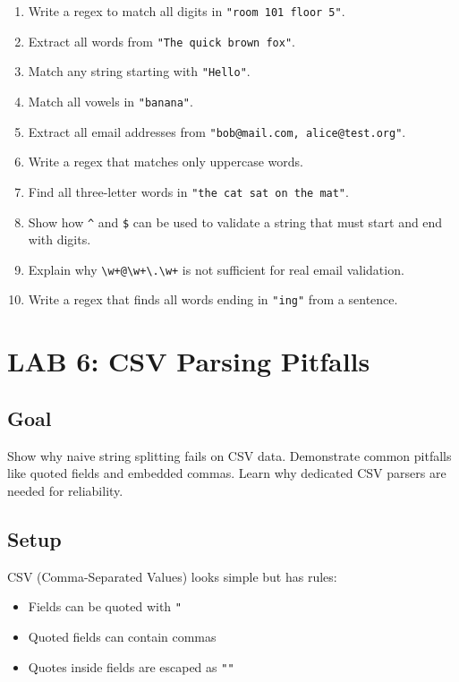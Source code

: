 \documentclass[
  letterpaper,
  DIV=11,
  numbers=noendperiod]{scrreprt}
\providecommand{\tightlist}{%
  \setlength{\itemsep}{0pt}\setlength{\parskip}{0pt}}
\begin{document}
\begin{enumerate}
\def\labelenumi{\arabic{enumi}.}
\tightlist
\item
  Write a regex to match all digits in \texttt{"room\ 101\ floor\ 5"}.
\item
  Extract all words from \texttt{"The\ quick\ brown\ fox"}.
\item
  Match any string starting with \texttt{"Hello"}.
\item
  Match all vowels in \texttt{"banana"}.
\item
  Extract all email addresses from
  \texttt{"bob@mail.com,\ alice@test.org"}.
\item
  Write a regex that matches only uppercase words.
\item
  Find all three-letter words in \texttt{"the\ cat\ sat\ on\ the\ mat"}.
\item
  Show how \texttt{\^{}} and \texttt{\$} can be used to validate a
  string that must start and end with digits.
\item
  Explain why
  \texttt{\textbackslash{}w+@\textbackslash{}w+\textbackslash{}.\textbackslash{}w+}
  is not sufficient for real email validation.
\item
  Write a regex that finds all words ending in \texttt{"ing"} from a
  sentence.
\end{enumerate}

\section{LAB 6: CSV Parsing Pitfalls}\label{lab-6-csv-parsing-pitfalls}

\subsection{Goal}\label{goal-5}

Show why naive string splitting fails on CSV data. Demonstrate common
pitfalls like quoted fields and embedded commas. Learn why dedicated CSV
parsers are needed for reliability.

\subsection{Setup}\label{setup-5}

CSV (Comma-Separated Values) looks simple but has rules:

\begin{itemize}
\tightlist
\item
  Fields can be quoted with \texttt{"}
\item
  Quoted fields can contain commas
\item
  Quotes inside fields are escaped as \texttt{""}
\end{itemize}
\end{document}
